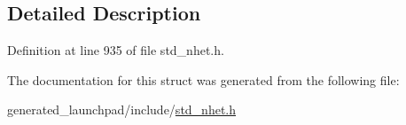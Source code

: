 \subsection{Detailed Description}


Definition at line 935 of file std\+\_\+nhet.\+h.



The documentation for this struct was generated from the following file\+:\begin{DoxyCompactItemize}
\item 
generated\+\_\+launchpad/include/\mbox{\hyperlink{std__nhet_8h}{std\+\_\+nhet.\+h}}\end{DoxyCompactItemize}
